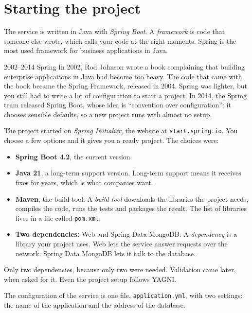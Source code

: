 \section{Starting the project}

The service is written in Java with \emph{Spring Boot}. A \emph{framework} is
code that someone else wrote, which calls your code at the right moments.
Spring is the most used framework for business applications in Java.

\begin{history}{2002--2014 \textperiodcentered{} Spring}
In 2002, Rod Johnson wrote a book complaining that building enterprise
applications in Java had become too heavy. The code that came with the book
became the Spring Framework, released in 2004. Spring was lighter, but you
still had to write a lot of configuration to start a project. In 2014, the
Spring team released Spring Boot, whose idea is ``convention over
configuration'': it chooses sensible defaults, so a new project runs with
almost no setup.
\end{history}

The project started on \emph{Spring Initializr}, the website at
\texttt{start.spring.io}. You choose a few options and it gives you a ready
project. The choices were:

\begin{itemize}
  \item \textbf{Spring Boot 4.2}, the current version.
  \item \textbf{Java 21}, a long-term support version. Long-term support
        means it receives fixes for years, which is what companies want.
  \item \textbf{Maven}, the build tool. A \emph{build tool} downloads the
        libraries the project needs, compiles the code, runs the tests and
        packages the result. The list of libraries lives in a file called
        \texttt{pom.xml}.
  \item \textbf{Two dependencies:} Web and Spring Data MongoDB. A
        \emph{dependency} is a library your project uses. Web lets the
        service answer requests over the network. Spring Data MongoDB lets it
        talk to the database.
\end{itemize}

Only two dependencies, because only two were needed. Validation came later,
when  asked for it. Even the project setup follows YAGNI.

The configuration of the service is one file, \texttt{application.yml}, with
two settings: the name of the application and the address of the database.

